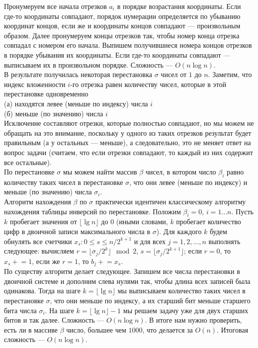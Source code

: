 \documentclass{article}
\begin{document}
Пронумеруем все начала отрезков $a_i$ в порядке возрастания координаты. Если где-то координаты совпадают, порядок нумерации определяется по убыванию координат концов, если же и координаты концов совпадают --- произвольным образом. Далее пронумеруем концы отрезков так, чтобы номер конца отрезка совпадал с номером его начала. Выпишем получившиеся номера концов отрезков в порядке убывания их координаты. Если где-то координаты совпадают --- выписываем их в произвольном порядке. Сложность --- $O(n \log n)$.\\
В результате получилась некоторая перестановка $\sigma$ чисел от $1$ до $n$. Заметим, что индекс вложенности $i$-го отрезка равен количеству чисел, которые в этой перестановке одновременно\\
(а) находятся левее (меньше по индексу) числа $i$\\
(б) меньше (по значению) числа $i$\\
Исключение составляют отрезки, которые полностью совпадают, но мы можем не обращать на это внимание, поскольку у одного из таких отрезков результат будет правильным (а у остальных --- меньше), а следовательно, это не меняет ответ на вопрос задачи (считаем, что если отрезки совпадают, то каждый из них содержит все остальные).\\
По перестановке $\sigma$ мы можем найти массив $\beta$ чисел, в котором число $\beta_i$ равно количеству таких чисел в перестановке $\sigma$, что они левее (меньше по индексу) и меньше (по значению) числа $\sigma_i$.\\
Алгоритм нахождения $\beta$ по $\sigma$ практически идентичен классическому алгоритму нахождения таблицы инверсий по перестановке. Положим $\beta_i = 0, \,i=1\ldots n$. Пусть $k$ пробегает 
значения от $\lfloor \lg n \rfloor$ до $0$ (иными словами, $k$ пробегает количество цифр в двоичной записи максимального числа в $\sigma$). Для каждого $k$ будем обнулять все счетчики $x_s: 0 \leqslant s \leqslant n/2^{k+1}$ и для всех $j=1,2,\ldots,n$ выполнять следующее: вычисляем $r=\lfloor \sigma_j/2^k \rfloor \mod 2$, $s = \lfloor \sigma_j/2^{k+1} \rfloor$; если $r=0$, то $x_s\mathrel{+}=1$, если же $r=1$, то $b_j\mathrel{+}=x_s$.\\
По существу алгоритм делает следующее. Запишем все числа перестановки в двоичной системе и дополним слева нулями так, чтобы длина всех записей была одинакова. Тогда на шаге $k = \lfloor \lg n \rfloor$ мы выписываем количество таких чисел в перестановке $\sigma$, что они меньше по индексу, а их старший бит меньше старшего бита числа $\sigma_i$. На шаге $k=\lfloor \lg n \rfloor - 1$ мы решаем задачу уже для двух старших битов и так далее. Сложность --- $O(n \log n)$. В итоге нам нужно проверить, есть ли в массиве $\beta$ число, большее чем $1000$, что делается за $O(n)$. Итоговая сложность --- $O(n \log n)$.
\end{document}
